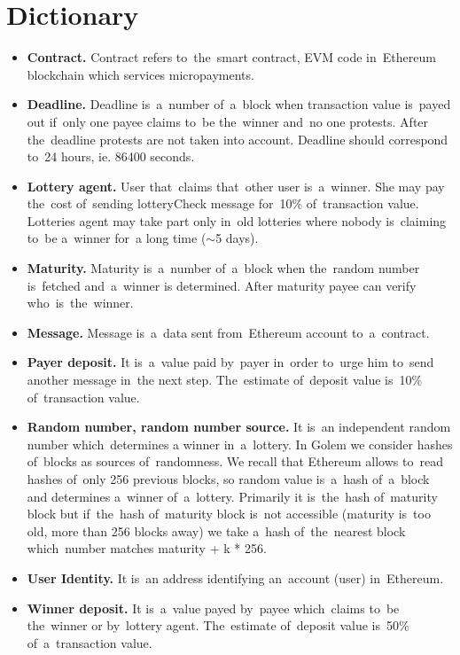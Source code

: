 \documentclass[a4paper]{article}
\begin{document}
\section{Dictionary}
    \begin{itemize}
        \item \textbf{Contract.} Contract refers to~the~smart contract, EVM code in~Ethereum blockchain which
            services micropayments.
        \item \textbf{Deadline.} Deadline is~a~number of~a~block when transaction value is~payed out if~only one
            payee claims to~be the~winner and~no one protests. After the~deadline protests are not taken into
            account. Deadline should correspond to~24 hours, ie. 86400 seconds.
        \item \textbf{Lottery agent.} User that~claims that~other user is~a~winner. She may pay the~cost of~sending
            lotteryCheck message for~10\% of~transaction value. Lotteries agent may take part only in~old lotteries
            where nobody is~claiming to~be a~winner for~a long time ($\sim$5 days).
        \item \textbf{Maturity.} Maturity is~a~number of~a~block when the~random number is~fetched and~a~winner is
            determined. After maturity payee can verify who~is~the~winner.
        \item \textbf{Message.} Message is~a~data sent from~Ethereum account to~a~contract.
        \item \textbf{Payer deposit.} It is~a~value paid by~payer in~order to~urge him to~send another message in~the
            next step. The~estimate of~deposit value is~10\% of~transaction value.
        \item \textbf{Random number, random number source.} It is~an independent random number which~determines a
            winner in~a~lottery. In Golem we consider hashes of~blocks as sources of~randomness. We recall that
            Ethereum allows to~read hashes of~only 256 previous blocks, so random value is~a~hash of~a~block and
            determines a~winner of~a~lottery. Primarily it is~the~hash of~maturity block but if~the~hash of~maturity
            block is~not accessible (maturity is~too old, more than 256 blocks away) we take a~hash of~the~nearest
            block which~number matches maturity + k * 256.
        \item \textbf{User Identity.} It is~an address identifying an~account (user) in~Ethereum.
        \item \textbf{Winner deposit.} It is~a~value payed by~payee which~claims to~be the~winner or by~lottery
            agent.  The~estimate of~deposit value is~50\% of~a~transaction value.
    \end{itemize}
\end{document}
